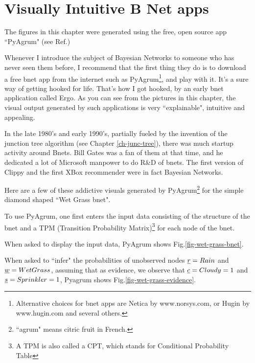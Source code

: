 \chapter{Visually Intuitive B Net apps}
\label{ch-bnet-apps}

The figures in this chapter were generated using
the free, open source app ``PyAgrum" (see Ref.\cite{pyagrum})


Whenever I introduce the subject of Bayesian Networks
to someone who has never seen them before, I recommend that the first thing they do is to
download a free bnet app from the internet such as PyAgrum\footnote{Alternative choices for bnet apps are Netica by www.norsys.com, or Hugin by www.hugin.com and several others.}, and play with it. It's a sure way of getting hooked
for life. That's how I got hooked, by an early bnet application called Ergo. As you can see from the pictures in this chapter,
the visual output generated by such applications is very ``explainable", intuitive and appealing.
  
In the late 1980's and early 1990's, partially fueled by the invention of
the junction tree algorithm (see Chapter \ref{ch-junc-tree}), there was much startup activity around Bnets. Bill Gates was a fan of them at that time, and he dedicated a lot of Microsoft manpower to do R\&D of bnets. The first version of Clippy and the first XBox recommender were in fact Bayesian Networks.

Here are a few of these addictive visuals generated by PyAgrum\footnote{``agrum" means citric fruit in French. }
for the simple diamond shaped  ``Wet Grass bnet".

To use PyAgrum, one first enters the input data consisting of the structure of the bnet and a TPM (Transition Probability Matrix)\footnote{A TPM is also called
a CPT, which stands for Conditional Probability Table}
for each node of the bnet.

When asked to display the input data, PyAgrum shows Fig.\ref{fig-wet-grass-bnet}.

When asked to ``infer" the probabilities of unobserved nodes ${\underline{r}}=Rain$
and ${\underline{w}}=WetGrass$,
assuming that as evidence, we observe that ${\underline{c}}=Cloudy=1$ and ${\underline{s}}=Sprinkler=1$, Pyagrum shows Fig.\ref{fig-wet-grass-evidence}.

